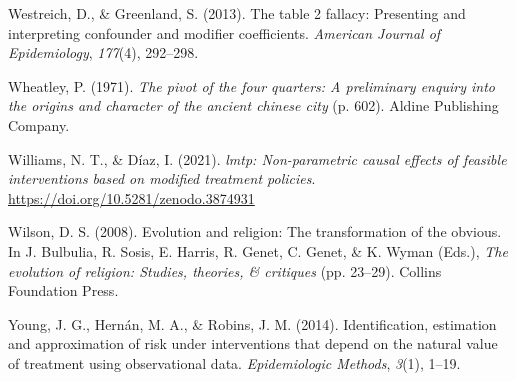 \documentclass[
  single column]{article}
\newlength{\cslhangindent}
\newenvironment{CSLReferences}[2] %
 {\begin{list}{}{%
  \setlength{\itemindent}{0pt}
  \setlength{\leftmargin}{0pt}
  \setlength{\parsep}{0pt}
  \ifodd #1
   \setlength{\leftmargin}{\cslhangindent}
   \setlength{\itemindent}{-1\cslhangindent}
  \fi
  \setlength{\itemsep}{#2\baselineskip}}}
 {\end{list}}
\begin{document}
\begin{CSLReferences}{1}{0}
Westreich, D., \& Greenland, S. (2013). The table 2 fallacy: Presenting
and interpreting confounder and modifier coefficients. \emph{American
Journal of Epidemiology}, \emph{177}(4), 292--298.

Wheatley, P. (1971). \emph{The pivot of the four quarters: A preliminary
enquiry into the origins and character of the ancient chinese city} (p.
602). Aldine Publishing Company.

Williams, N. T., \& Díaz, I. (2021). \emph{{l}mtp: Non-parametric causal
effects of feasible interventions based on modified treatment policies}.
\url{https://doi.org/10.5281/zenodo.3874931}

Wilson, D. S. (2008). Evolution and religion: The transformation of the
obvious. In J. Bulbulia, R. Sosis, E. Harris, R. Genet, C. Genet, \& K.
Wyman (Eds.), \emph{The evolution of religion: Studies, theories, \&
critiques} (pp. 23--29). Collins Foundation Press.

Young, J. G., Hernán, M. A., \& Robins, J. M. (2014). Identification,
estimation and approximation of risk under interventions that depend on
the natural value of treatment using observational data.
\emph{Epidemiologic Methods}, \emph{3}(1), 1--19.

\end{CSLReferences}
\end{document}

